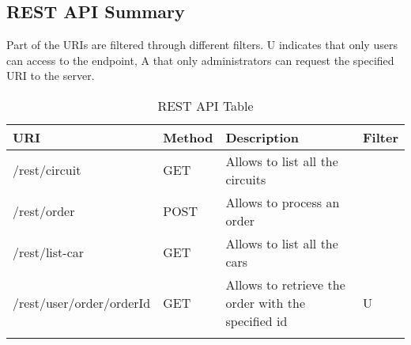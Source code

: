 \subsection{REST API Summary}

Part of the URIs are filtered through different filters. U indicates that only users can access to the endpoint,
A that only administrators can request the specified URI to the server.

\begin{longtable}{|p{}|p{} |p{}|p{}|} 
\hline
\textbf{URI} & \textbf{Method} & \textbf{Description} & \textbf{Filter} \\\hline
/rest/circuit & GET & Allows to list all the circuits \\\hline
/rest/order & POST & Allows to process an order \\\hline
/rest/list-car & GET & Allows to list all the cars \\\hline
/rest/user/order/{orderId} & GET & Allows to retrieve the order with the specified id & U \\\hline

\caption{REST API Table}
\label{tab:termGlossary}
\end{longtable}